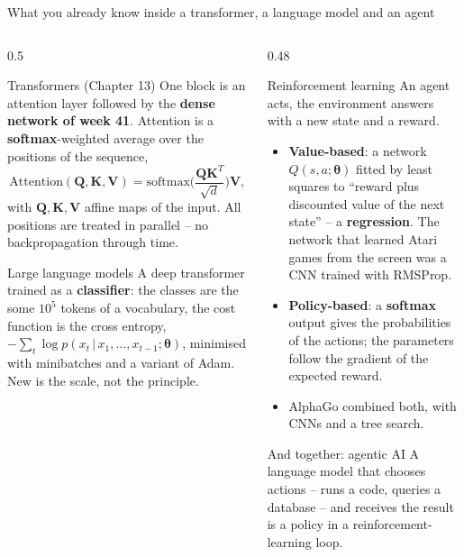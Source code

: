 \documentclass[10pt,aspectratio=169]{beamer}
\begin{document}
\begin{frame}{What you already know inside a transformer, a language model and an agent}
\begin{columns}[T]
\begin{column}{0.5\textwidth}
\footnotesize
\begin{block}{Transformers (Chapter 13)}
One block is an attention layer followed by the \textbf{dense network of
week 41}.  Attention is a \textbf{softmax}-weighted average over the
positions of the sequence,
\[
\mathrm{Attention}(\bm{Q},\bm{K},\bm{V})=
\mathrm{softmax}\Big(\frac{\bm{Q}\bm{K}^T}{\sqrt{d}}\Big)\bm{V},
\]
with $\bm{Q},\bm{K},\bm{V}$ affine maps of the input.  All positions are
treated in parallel -- no backpropagation through time.
\end{block}
\begin{block}{Large language models}
A deep transformer trained as a \textbf{classifier}: the classes are the
some $10^5$ tokens of a vocabulary, the cost function is the cross entropy,
$-\sum_t\log p(x_t\,|\,x_1,\dots,x_{t-1};\bm{\theta})$, minimised with
minibatches and a variant of Adam.  New is the scale, not the principle.
\end{block}
\end{column}
\begin{column}{0.48\textwidth}
\footnotesize
\begin{block}{Reinforcement learning}
An agent acts, the environment answers with a new state and a reward.
\begin{itemize}
  \item \textbf{Value-based}: a network $Q(s,a;\bm{\theta})$ fitted by
    least squares to ``reward plus discounted value of the next state'' --
    a \textbf{regression}.  The network that learned Atari games from the
    screen was a CNN trained with RMSProp.
  \item \textbf{Policy-based}: a \textbf{softmax} output gives the
    probabilities of the actions; the parameters follow the gradient of
    the expected reward.
  \item AlphaGo combined both, with CNNs and a tree search.
\end{itemize}
\end{block}
\begin{block}{And together: agentic AI}
A language model that chooses actions -- runs a code, queries a database
-- and receives the result is a policy in a reinforcement-learning loop.
\end{block}
\end{column}
\end{columns}
\end{frame}
\end{document}
